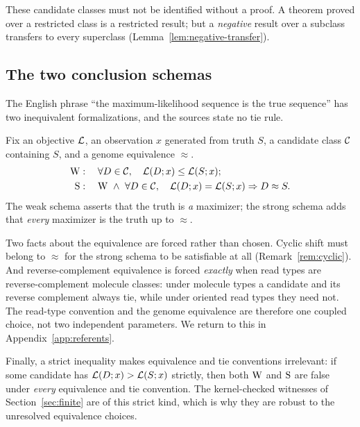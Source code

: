 These candidate classes must not be identified without a proof. A theorem proved over a restricted class is a restricted result;
but a \emph{negative} result over a subclass transfers to every superclass
(Lemma~\ref{lem:negative-transfer}).

\subsection{The two conclusion schemas}

The English phrase ``the maximum-likelihood sequence is the true sequence'' has
two inequivalent formalizations, and the sources state no tie rule.

\begin{definition}
\label{def:schemas}
Fix an objective $\mathcal{L}$, an observation $x$ generated from truth $S$, a
candidate class $\mathcal{C}$ containing $S$, and a genome equivalence $\approx$.
\begin{align*}
  \mathrm{W} &: \quad \forall D \in \mathcal{C},\quad \mathcal{L}(D;x) \le \mathcal{L}(S;x);\\
  \mathrm{S} &: \quad \mathrm{W} \ \wedge\ \forall D \in \mathcal{C},\quad
             \mathcal{L}(D;x)=\mathcal{L}(S;x) \Rightarrow D \approx S.
\end{align*}
The weak schema asserts that the truth is \emph{a} maximizer; the strong schema
adds that \emph{every} maximizer is the truth up to $\approx$.
\end{definition}

Two facts about the equivalence are forced rather than chosen.
Cyclic shift must belong to $\approx$ for the strong schema to be satisfiable at
all (Remark~\ref{rem:cyclic}). And reverse-complement equivalence is forced
\emph{exactly} when read types are reverse-complement molecule classes: under
molecule types a candidate and its reverse complement always tie, while under
oriented read types they need not. The read-type convention and the genome
equivalence are therefore one coupled choice, not two independent parameters.
We return to this in Appendix~\ref{app:referents}.

Finally, a strict inequality makes equivalence and tie conventions irrelevant: if
some candidate has $\mathcal{L}(D;x) > \mathcal{L}(S;x)$ strictly, then both $\mathrm{W}$ and
$\mathrm{S}$ are false under \emph{every} equivalence and tie convention. The
kernel-checked witnesses of Section~\ref{sec:finite} are of this strict kind,
which is why they are robust to the unresolved equivalence choices.
